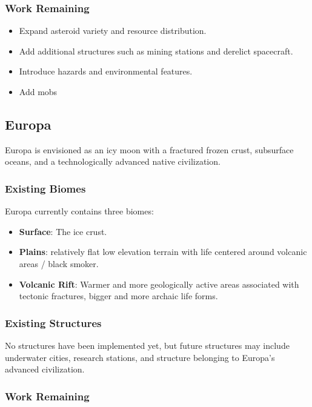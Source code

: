 \documentclass{article}
\begin{document}
\subsubsection{Work Remaining}

\begin{itemize}
    \item Expand asteroid variety and resource distribution.
    \item Add additional structures such as mining stations and derelict spacecraft.
    \item Introduce hazards and environmental features.
    \item Add mobs
\end{itemize}


\subsection{Europa}

Europa is envisioned as an icy moon with a fractured frozen crust, subsurface oceans, and a technologically advanced native civilization.

\subsubsection{Existing Biomes}

Europa currently contains three biomes:

\begin{itemize}
    \item \textbf{Surface}: The ice crust.
    \item \textbf{Plains}: relatively flat low elevation terrain with life centered around volcanic areas / black smoker.
    \item \textbf{Volcanic Rift}: Warmer and more geologically active areas associated with tectonic fractures, bigger and more archaic life forms.
\end{itemize}

\subsubsection{Existing Structures}

No structures have been implemented yet, but future structures may include underwater cities, research stations, and structure belonging to Europa's advanced civilization.

\subsubsection{Work Remaining}
\end{document}
